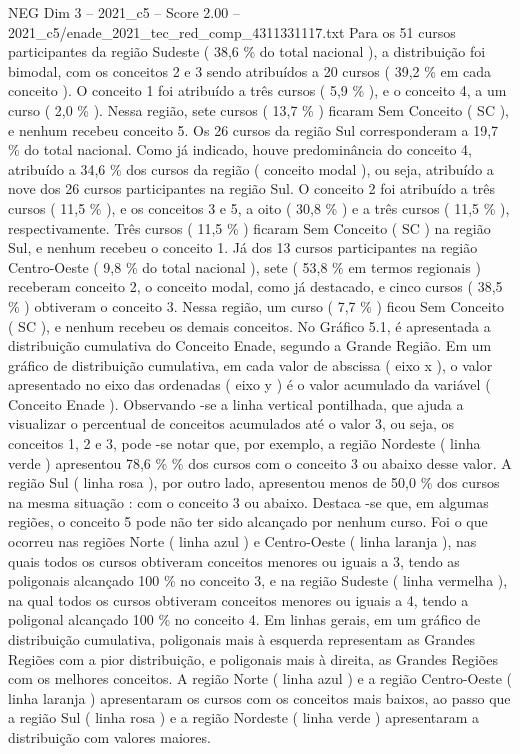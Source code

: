 \begin{textsample}{NEG Dim 3 – 2021\_c5 – Score 2.00 – 2021\_c5/enade\_2021\_tec\_red\_comp\_4311331117.txt}
Para os 51 cursos participantes da região Sudeste ( 38,6 \% do total nacional ), a distribuição foi bimodal, com os conceitos 2 e 3 sendo atribuídos a 20 cursos ( 39,2 \% em cada conceito ).
O conceito 1 foi atribuído a três cursos ( 5,9 \% ), e o conceito 4, a um curso ( 2,0 \% ).
Nessa região, sete cursos ( 13,7 \% ) ficaram Sem Conceito ( SC ), e nenhum recebeu conceito 5.
Os 26 cursos da região Sul corresponderam a 19,7 \% do total nacional.
Como já indicado, houve predominância do conceito 4, atribuído a 34,6 \% dos cursos da região ( conceito modal ), ou seja, atribuído a nove dos 26 cursos participantes na região Sul.
O conceito 2 foi atribuído a três cursos ( 11,5 \% ), e os conceitos 3 e 5, a oito ( 30,8 \% ) e a três cursos ( 11,5 \% ), respectivamente.
Três cursos ( 11,5 \% ) ficaram Sem Conceito ( SC ) na região Sul, e nenhum recebeu o conceito 1.
Já dos 13 cursos participantes na região Centro-Oeste ( 9,8 \% do total nacional ), sete ( 53,8 \% em termos regionais ) receberam conceito 2, o conceito modal, como já destacado, e cinco cursos ( 38,5 \% ) obtiveram o conceito 3.
Nessa região, um curso ( 7,7 \% ) ficou Sem Conceito ( SC ), e nenhum recebeu os demais conceitos.
No Gráfico 5.1, é apresentada a distribuição cumulativa do Conceito Enade, segundo a Grande Região.
Em um gráfico de distribuição cumulativa, em cada valor de abscissa ( eixo x ), o valor apresentado no eixo das ordenadas ( eixo y ) é o valor acumulado da variável ( Conceito Enade ).
Observando -se a linha vertical pontilhada, que ajuda a visualizar o percentual de conceitos acumulados até o valor 3, ou seja, os conceitos 1, 2 e 3, pode -se notar que, por exemplo, a região Nordeste ( linha verde ) apresentou 78,6 \% \% dos cursos com o conceito 3 ou abaixo desse valor.
A região Sul ( linha rosa ), por outro lado, apresentou menos de 50,0 \% dos cursos na mesma situação : com o conceito 3 ou abaixo.
Destaca -se que, em algumas regiões, o conceito 5 pode não ter sido alcançado por nenhum curso.
Foi o que ocorreu nas regiões Norte ( linha azul ) e Centro-Oeste ( linha laranja ), nas quais todos os cursos obtiveram conceitos menores ou iguais a 3, tendo as poligonais alcançado 100 \% no conceito 3, e na região Sudeste ( linha vermelha ), na qual todos os cursos obtiveram conceitos menores ou iguais a 4, tendo a poligonal alcançado 100 \% no conceito 4.
Em linhas gerais, em um gráfico de distribuição cumulativa, poligonais mais à esquerda representam as Grandes Regiões com a pior distribuição, e poligonais mais à direita, as Grandes Regiões com os melhores conceitos.
A região Norte ( linha azul ) e a região Centro-Oeste ( linha laranja ) apresentaram os cursos com os conceitos mais baixos, ao passo que a região Sul ( linha rosa ) e a região Nordeste ( linha verde ) apresentaram a distribuição com valores maiores.

\end{textsample}
